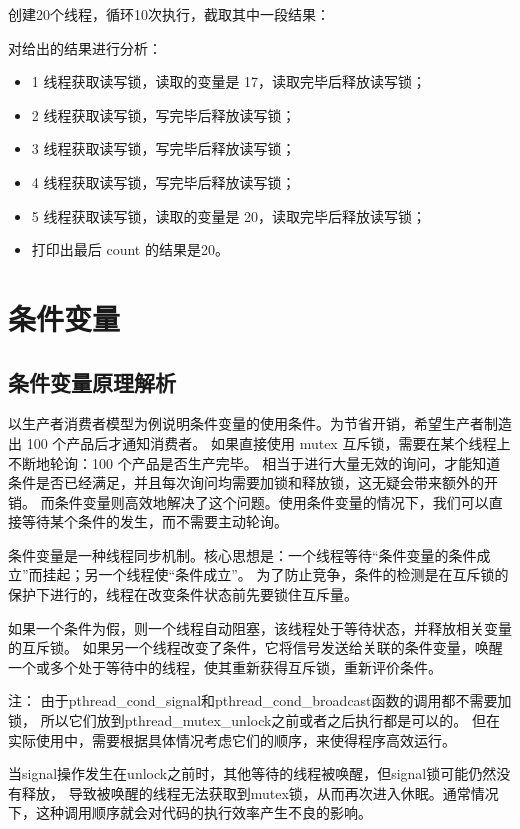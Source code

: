 \documentclass[11pt]{ctexart}
\newenvironment{note}{\kaishu 注：}{}
\begin{document}
创建20个线程，循环10次执行，截取其中一段结果：



对给出的结果进行分析：
\begin{itemize}
    \item 1 线程获取读写锁，读取的变量是 17，读取完毕后释放读写锁；
    \item 2 线程获取读写锁，写完毕后释放读写锁；
    \item 3 线程获取读写锁，写完毕后释放读写锁；
    \item 4 线程获取读写锁，写完毕后释放读写锁；
    \item 5 线程获取读写锁，读取的变量是 20，读取完毕后释放读写锁；
    \item 打印出最后 count 的结果是20。
\end{itemize}


\section{条件变量}

\subsection{条件变量原理解析}

以生产者消费者模型为例说明条件变量的使用条件。为节省开销，希望生产者制造出 100 个产品后才通知消费者。
如果直接使用 mutex 互斥锁，需要在某个线程上不断地轮询：100 个产品是否生产完毕。
相当于进行大量无效的询问，才能知道条件是否已经满足，并且每次询问均需要加锁和释放锁，这无疑会带来额外的开销。
而条件变量则高效地解决了这个问题。使用条件变量的情况下，我们可以直接等待某个条件的发生，而不需要主动轮询。

条件变量是一种线程同步机制。核心思想是：一个线程等待“条件变量的条件成立”而挂起；另一个线程使“条件成立”。
为了防止竞争，条件的检测是在互斥锁的保护下进行的，线程在改变条件状态前先要锁住互斥量。

如果一个条件为假，则一个线程自动阻塞，该线程处于等待状态，并释放相关变量的互斥锁。
如果另一个线程改变了条件，它将信号发送给关联的条件变量，唤醒一个或多个处于等待中的线程，使其重新获得互斥锁，重新评价条件。

\begin{note}
由于{\ttfamily pthread\_cond\_signal}和{\ttfamily pthread\_cond\_broadcast}函数的调用都不需要加锁，
所以它们放到{\ttfamily pthread\_mutex\_unlock}之前或者之后执行都是可以的。
但在实际使用中，需要根据具体情况考虑它们的顺序，来使得程序高效运行。

当{\ttfamily signal}操作发生在{\ttfamily unlock}之前时，其他等待的线程被唤醒，但{\ttfamily signal}锁可能仍然没有释放，
导致被唤醒的线程无法获取到{\ttfamily mutex}锁，从而再次进入休眠。通常情况下，这种调用顺序就会对代码的执行效率产生不良的影响。
\end{note}
\end{document}
